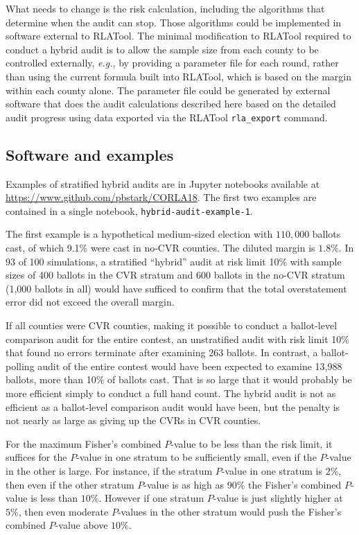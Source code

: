 \documentclass[runningheads]{llncs}
\begin{document}
What needs to change is the risk calculation, including the
algorithms that determine when the audit can stop.
Those algorithms could be implemented in software external to RLATool.
The minimal modification to RLATool required to conduct
a hybrid audit is to allow the sample size from each county to be controlled externally,
\emph{e.g.}, by providing a parameter file for each round,
rather than using the current formula built into RLATool, 
which is based on the margin within each county alone.
The parameter file could be generated by external software that does the
audit calculations described here based on the detailed
audit progress using data exported via the RLATool \texttt{rla\_export} command.


\subsection{Software and examples}
Examples of stratified hybrid audits are in Jupyter notebooks available
at \url{https://www.github.com/pbstark/CORLA18}.
The first two examples are contained in a single notebook, \texttt{hybrid-audit-example-1}.

The first example is a hypothetical medium-sized election with 
$110,000$ ballots cast, of which 
9.1\% were cast in no-CVR counties. 
The diluted margin is $1.8\%$.
In 93 of 100 simulations, a stratified ``hybrid'' audit at risk limit 10\% with sample sizes of 400 ballots 
in the CVR stratum and 600 ballots in the no-CVR stratum
(1,000 ballots in all)
would have sufficed to confirm that the total overstatement error did not exceed the overall margin.

If all counties were CVR counties, making it possible to conduct a ballot-level comparison audit for the entire contest, an unstratified audit with risk limit 10\% that found no errors terminate 
after examining 263 ballots.
In contrast, a ballot-polling audit of the entire contest would have been expected to examine
13,988 ballots, more than 10\% of ballots cast.
That is so large that it would probably be more efficient simply to conduct a full hand count.
The hybrid audit is not as efficient as a ballot-level comparison audit would have been, but the penalty
is not nearly as large as giving up the CVRs in CVR counties.

For the maximum Fisher's combined $P$-value to be less than the risk limit,
it suffices for the $P$-value in one stratum to be sufficiently small, even if 
the $P$-value in the other is large. 
For instance, if the stratum $P$-value in one stratum is $2\%$,
then even if the other stratum $P$-value is as high as $90\%$
the Fisher's combined $P$-value is less than $10\%$.
However if one stratum $P$-value is just slightly higher at $5\%$,
then even moderate $P$-values in the other stratum would push 
the Fisher's combined $P$-value above $10\%$.
\end{document}
